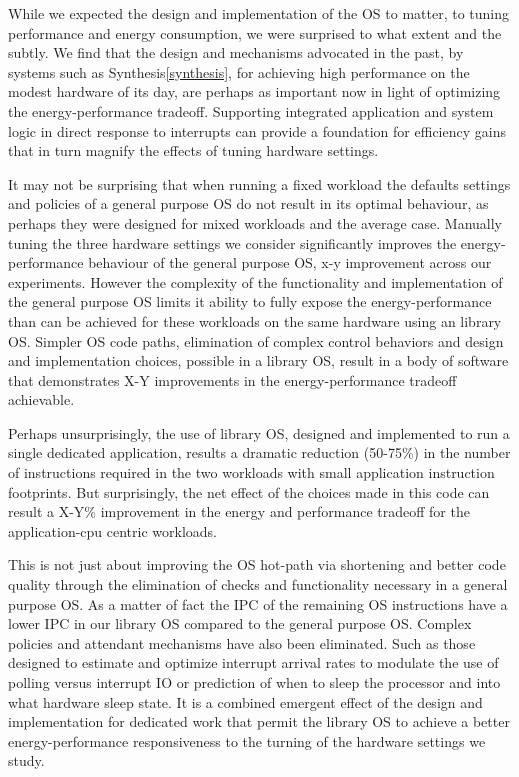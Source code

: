 While we expected the design and implementation of the OS to matter, to tuning performance and energy consumption, we were surprised to what extent and the subtly.    
We find that the design and mechanisms advocated in the past, by systems such as Synthesis\ref{synthesis}, for achieving high performance on the modest hardware of its day, are perhaps as important now in light of optimizing the energy-performance tradeoff.   
Supporting integrated application and system logic in direct response to interrupts can provide a foundation for efficiency gains that in turn magnify the effects of tuning hardware settings.    

It may not be surprising that when running a fixed workload the defaults settings and policies of a general purpose OS do not result in its optimal behaviour, as perhaps they were designed for mixed workloads and the average case.  
Manually tuning the three hardware settings we consider significantly improves the energy-performance behaviour of the general purpose OS, x-y improvement across our experiments.  
However the complexity of the functionality and implementation of the general purpose OS limits it ability to fully expose the energy-performance than can be achieved for these workloads on the same hardware using an library OS.  
Simpler OS code paths, elimination of complex control behaviors and design and implementation choices, possible in a library OS, result in a body of software that demonstrates X-Y improvements in the energy-performance tradeoff achievable.    



Perhaps unsurprisingly, the use of library OS, designed and implemented to run a single dedicated application, results a dramatic reduction (50-75\%) in the number of instructions required in the two workloads with small application instruction footprints.  
But surprisingly, the net effect of the choices made in this code can result a X-Y\% improvement in the energy and performance tradeoff for the application-cpu centric workloads. 

This is not just about improving the OS hot-path via shortening and better code quality through the elimination of checks and functionality necessary in a general purpose OS. As a matter of fact the IPC of the remaining OS instructions have a lower IPC in our library OS compared to the general purpose OS.  
Complex policies and attendant mechanisms have also been eliminated.  Such as those designed to estimate and optimize interrupt arrival rates to modulate the use of polling versus interrupt IO or prediction of when to sleep the processor and into what hardware sleep state.  
It is a combined emergent effect of the design and implementation for dedicated work that permit the library OS to achieve a better energy-performance responsiveness to the turning of the hardware settings we study. 
 
